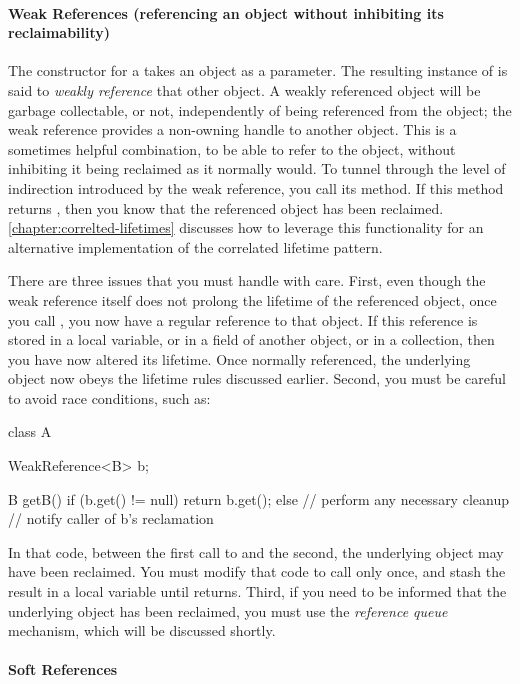 \paragraph{Weak References (referencing an object without inhibiting its
reclaimability)}

The constructor for a  takes an object as a parameter. The
resulting instance of  is said to \emph{weakly reference}
that other object. A weakly referenced object will be garbage collectable, or
not, independently of being referenced from the  object; the
weak reference provides a non-owning handle to another object. This is a
sometimes helpful combination, to be able to refer to the object, without
inhibiting it being reclaimed as it normally would. To tunnel through the level
of indirection introduced by the weak reference, you call its  method.
If this method returns , then you know that the referenced object has
been reclaimed. \autoref{chapter:correlted-lifetimes} discusses how to leverage
this functionality for an alternative implementation of the correlated lifetime
pattern.

There are three issues that you must handle with care. First, even though the
weak reference itself does not prolong the lifetime of the referenced object,
once you call , you now have a regular reference to that object. If
this reference is stored in a local variable, or in a field of another object, or
in a collection, then you have now altered its lifetime. Once normally
referenced, the underlying object now obeys the lifetime rules discussed earlier.
Second, you must be careful to avoid race conditions, such as:
\begin{shortlisting}
class A {
   WeakReference<B> b;
   
   B getB() {
      if (b.get() != null) {
         return b.get();
      } else {
         // perform any necessary cleanup
         // notify caller of b's reclamation
      }
   }
}
\end{shortlisting}
In that code, between the first call to  and the second, the
underlying object may have been reclaimed. You must modify that code to call
 only once, and stash the result in a local variable until
 returns. Third, if you need to be informed that the underlying object
has been reclaimed, you must use the \emph{reference queue} mechanism, which will
be discussed shortly.

\paragraph{Soft References}

